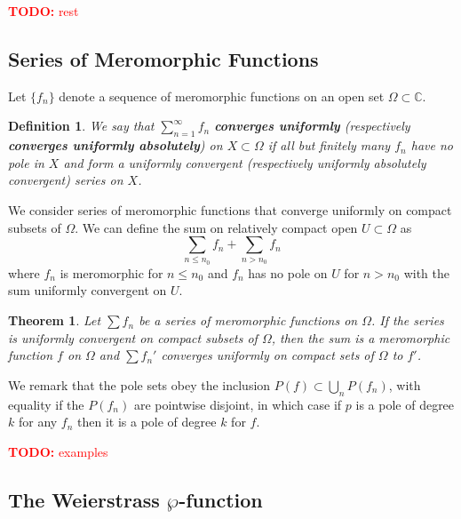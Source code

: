 \documentclass{article}
\newtheorem{theorem}{Theorem}
\newcommand{\mbb}[1]{\mathbb{#1}}
\newtheorem{definition}{Definition}
\newcommand{\TODO}[1]{\begin{center}\huge{\textcolor{red}{\textbf{TODO:} #1}}\end{center}}
\begin{document}
\TODO{rest}

\subsection{Series of Meromorphic Functions}

Let \(\{f_n\}\) denote a sequence of meromorphic functions on an open set \(\Omega \subset \mbb{C}\).
\begin{definition}
We say that \(\sum_{n = 1}^\infty f_n\) \textbf{converges uniformly} (respectively \textbf{converges uniformly absolutely}) on \(X \subset \Omega\) if all but finitely many \(f_n\) have no pole in \(X\) and form a uniformly convergent (respectively uniformly absolutely convergent) series on \(X\).
\end{definition}
We consider series of meromorphic functions that converge uniformly on compact subsets of \(\Omega\). We can define the sum on relatively compact open \(U \subset \Omega\) as
\[\sum_{n \leq n_0}f_n + \sum_{n > n_0}f_n\]
where \(f_n\) is meromorphic for \(n \leq n_0\) and \(f_n\) has no pole on \(U\) for \(n > n_0\) with the sum uniformly convergent on \(U\).
\begin{theorem}
Let \(\sum f_n\) be a series of meromorphic functions on \(\Omega\). If the series is uniformly convergent on compact subsets of \(\Omega\), then the sum is a meromorphic function \(f\) on \(\Omega\) and \(\sum f_n'\) converges uniformly on compact sets of \(\Omega\) to \(f'\).
\end{theorem}
We remark that the pole sets obey the inclusion \(P(f) \subset \bigcup_nP(f_n)\), with equality if the \(P(f_n)\) are pointwise disjoint, in which case if \(p\) is a pole of degree \(k\) for any \(f_n\) then it is a pole of degree \(k\) for \(f\).

\TODO{examples}

\subsection{The Weierstrass \(\wp\)-function}
\end{document}
